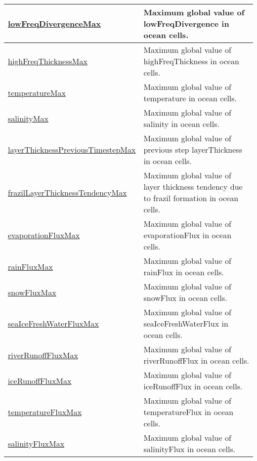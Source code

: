 {\begin{center}
\begin{longtable}{| p{2.0in} | p{4.0in} |}
    \hline
    \hyperref[subsec:var_sec_globalStatsAM_lowFreqDivergenceMax]{lowFreqDivergenceMax} & Maximum global value of lowFreqDivergence in ocean cells. \\
    \hline
    \hyperref[subsec:var_sec_globalStatsAM_highFreqThicknessMax]{highFreqThicknessMax} & Maximum global value of highFreqThickness in ocean cells. \\
    \hline
    \hyperref[subsec:var_sec_globalStatsAM_temperatureMax]{temperatureMax} & Maximum global value of temperature in ocean cells. \\
    \hline
    \hyperref[subsec:var_sec_globalStatsAM_salinityMax]{salinityMax} & Maximum global value of salinity in ocean cells. \\
    \hline
    \hyperref[subsec:var_sec_globalStatsAM_layerThicknessPreviousTimestepMax]{layerThicknessPreviousTimestep\-Max} & Maximum global value of previous step layerThickness in ocean cells. \\
    \hline
    \hyperref[subsec:var_sec_globalStatsAM_frazilLayerThicknessTendencyMax]{frazilLayerThicknessTendency\-Max} & Maximum global value of layer thickness tendency due to frazil formation in ocean cells. \\
    \hline
    \hyperref[subsec:var_sec_globalStatsAM_evaporationFluxMax]{evaporationFluxMax} & Maximum global value of evaporationFlux in ocean cells. \\
    \hline
    \hyperref[subsec:var_sec_globalStatsAM_rainFluxMax]{rainFluxMax} & Maximum global value of rainFlux in ocean cells. \\
    \hline
    \hyperref[subsec:var_sec_globalStatsAM_snowFluxMax]{snowFluxMax} & Maximum global value of snowFlux in ocean cells. \\
    \hline
    \hyperref[subsec:var_sec_globalStatsAM_seaIceFreshWaterFluxMax]{seaIceFreshWaterFluxMax} & Maximum global value of seaIceFreshWaterFlux in ocean cells. \\
    \hline
    \hyperref[subsec:var_sec_globalStatsAM_riverRunoffFluxMax]{riverRunoffFluxMax} & Maximum global value of riverRunoffFlux in ocean cells. \\
    \hline
    \hyperref[subsec:var_sec_globalStatsAM_iceRunoffFluxMax]{iceRunoffFluxMax} & Maximum global value of iceRunoffFlux in ocean cells. \\
    \hline
    \hyperref[subsec:var_sec_globalStatsAM_temperatureFluxMax]{temperatureFluxMax} & Maximum global value of temperatureFlux in ocean cells. \\
    \hline
    \hyperref[subsec:var_sec_globalStatsAM_salinityFluxMax]{salinityFluxMax} & Maximum global value of salinityFlux in ocean cells. \\

\end{longtable}
\end{center}}
